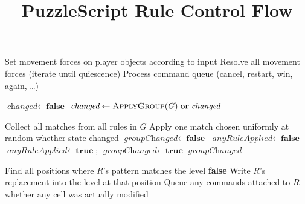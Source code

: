 \documentclass[10pt]{article}
\title{PuzzleScript Rule Control Flow}
\date{}
\begin{document}
\maketitle

\begin{algorithm}[H]
\caption{\textsc{Tick}(input direction)}
\begin{algorithmic}[1]
\State Set movement forces on player objects according to input
\State {}
\State Resolve all movement forces (iterate until quiescence)
\State {}
\State Process command queue (cancel, restart, win, again, \ldots)
\end{algorithmic}
\end{algorithm}

\begin{algorithm}[H]
\caption{\textsc{ApplyRuleBlocks}(blocks)}
\begin{algorithmic}[1]
    \Repeat
        \State $\textit{changed} \gets \textbf{false}$
            \State $\textit{changed} \gets \Call{ApplyGroup}{G} \;\mathbf{or}\; \textit{changed}$
        \EndFor
\end{algorithmic}
\end{algorithm}

\begin{algorithm}[H]
\caption{\textsc{ApplyGroup}(group $G$)}
\begin{algorithmic}[1]
    \State Collect all matches from all rules in $G$
    \State Apply one match chosen uniformly at random
    \State \Return whether state changed
\EndIf
\Statex
\State $\textit{groupChanged} \gets \textbf{false}$
\Repeat
    \State $\textit{anyRuleApplied} \gets \textbf{false}$
            \State $\textit{anyRuleApplied} \gets \textbf{true}$;\;
                   $\textit{groupChanged} \gets \textbf{true}$
        \EndIf
    \EndFor
{}
\State \Return $\textit{groupChanged}$
\end{algorithmic}
\end{algorithm}

\begin{algorithm}[H]
\caption{\textsc{ApplyRule}(rule $R$)}
\begin{algorithmic}[1]
\State Find all positions where $R$'s pattern matches the level
 \Return \textbf{false} \EndIf
{}
    \State Write $R$'s replacement into the level at that position
\EndFor
\State Queue any commands attached to $R$
\State \Return whether any cell was actually modified
\end{algorithmic}
\end{algorithm}
\end{document}
